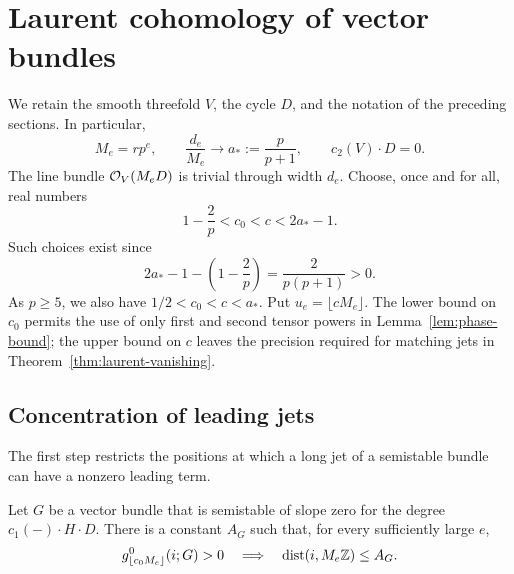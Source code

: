 \section{Laurent cohomology of vector bundles}
\label{sec:laurent}

We retain the smooth threefold $V$, the cycle $D$, and the notation of
the preceding sections.  In particular,
\begin{equation}\label{eq:laurent-width-input}
 M_e=rp^e,\qquad \frac{d_e}{M_e}\longrightarrow
 a_*:=\frac{p}{p+1},\qquad c_2(V)\cdot D=0.
\end{equation}
The line bundle $\mathcal O_V(M_eD)$ is trivial through width $d_e$.
Choose, once and for all, real numbers
\begin{equation}\label{eq:phase-constants}
 1-\frac2p<c_0<c<2a_*-1.
\end{equation}
Such choices exist since
\[
 2a_*-1-\left(1-\frac2p\right)=\frac{2}{p(p+1)}>0.
\]
As $p\ge5$, we also have $1/2<c_0<c<a_*$.
Put $u_e=\lfloor cM_e\rfloor$.
The lower bound on $c_0$ permits the use of only first and second
tensor powers in Lemma~\ref{lem:phase-bound}; the upper bound on $c$
leaves the precision required for matching jets in
Theorem~\ref{thm:laurent-vanishing}.

\subsection{Concentration of leading jets}

The first step restricts the positions at which a long jet of a
semistable bundle can have a nonzero leading term.

\begin{lemma}\label{lem:phase-bound}
Let $G$ be a vector bundle that is semistable of slope zero for the
degree $c_1(-)\cdot H\cdot D$.  There is a constant $A_G$ such that,
for every sufficiently large $e$,
\[
 g^0_{\lfloor c_0M_e\rfloor}(i;G)>0
 \quad\Longrightarrow\quad
 \operatorname{dist}(i,M_e\mathbb Z)\le A_G.
\]
\end{lemma}

